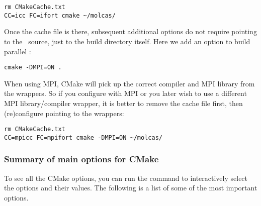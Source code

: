 \begin{verbatim}
rm CMakeCache.txt
CC=icc FC=ifort cmake ~/molcas/
\end{verbatim}

Once the cache file is there, subsequent additional options do not
require pointing to the \molcas\ source, just to the build directory
itself. Here we add an option to build parallel \molcas:

\begin{verbatim}
cmake -DMPI=ON .
\end{verbatim}

When using MPI, CMake will pick up the correct compiler and MPI library from the wrappers.
So if you configure with MPI or you later wish to use a different MPI library/compiler wrapper, it is better
to remove the cache file first, then (re)configure pointing to the wrappers:

\begin{verbatim}
rm CMakeCache.txt
CC=mpicc FC=mpifort cmake -DMPI=ON ~/molcas/
\end{verbatim}


\subsubsection{Summary of main options for CMake}

To see all the CMake options, you can run the  command to interactively
select the options and their values. The following is a list of some of the most
important options.


